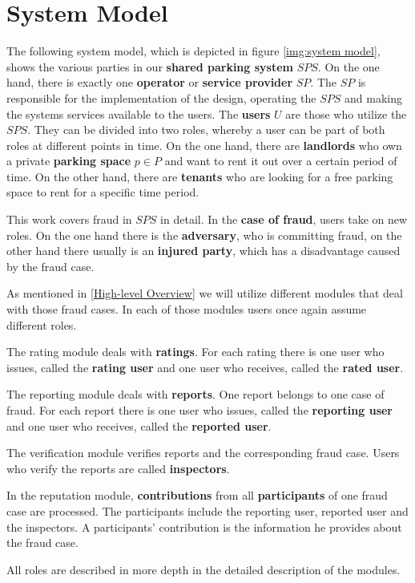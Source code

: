 \section{System Model}\label{System Model}
The following system model, which is depicted in figure \ref{img:system model}, shows the various parties in our \textbf{shared parking system} $SPS$. On the one hand, there is exactly one \textbf{operator} or \textbf{service provider} $SP$. The $SP$ is responsible for the implementation of the design, operating the $SPS$ and making the systems services available to the users. The \textbf{users} $U$ are those who utilize the $SPS$. They can be divided into two roles, whereby a user can be part of both roles at different points in time. On the one hand, there are \textbf{landlords} who own a private \textbf{parking space} $p \in P$ and want to rent it out over a certain period of time. On the other hand, there are \textbf{tenants} who are looking for a free parking space to rent for a specific time period.

This work covers fraud in $SPS$ in detail. In the \textbf{case of fraud}, users take on new roles. On the one hand there is the \textbf{adversary}, who is committing fraud, on the other hand there usually is an \textbf{injured party}, which has a disadvantage caused by the fraud case.

As mentioned in \ref{High-level Overview} we will utilize different modules that deal with those fraud cases. In each of those modules users once again assume different roles.

The rating module deals with \textbf{ratings}. For each rating there is one user who issues, called the\textbf{ rating user} and one user who receives, called the \textbf{rated user}.

The reporting module deals with \textbf{reports}. One report belongs to one case of fraud. For each report there is one user who issues, called the \textbf{reporting user} and one user who receives, called the \textbf{reported user}.

The verification module verifies reports and the corresponding fraud case. Users who verify the reports are called \textbf{inspectors}.

In the reputation module, \textbf{contributions} from all \textbf{participants} of one fraud case are processed. The participants include the reporting user, reported user and the inspectors. A participants' contribution is the information he provides about the fraud case.

All roles are described in more depth in the detailed description of the modules.\\

